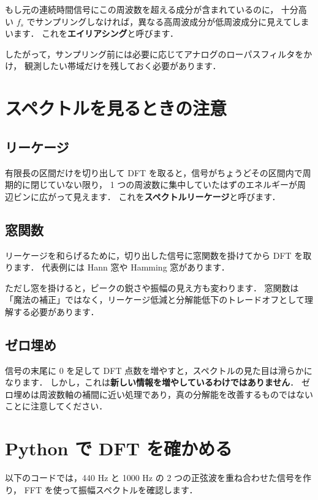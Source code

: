 もし元の連続時間信号にこの周波数を超える成分が含まれているのに，
十分高い $f_s$ でサンプリングしなければ，異なる高周波成分が低周波成分に見えてしまいます．
これを\textbf{エイリアシング}と呼びます．

したがって，サンプリング前には必要に応じてアナログのローパスフィルタをかけ，
観測したい帯域だけを残しておく必要があります．


\section{スペクトルを見るときの注意}

\subsection{リーケージ}

有限長の区間だけを切り出して DFT を取ると，信号がちょうどその区間内で周期的に閉じていない限り，
1 つの周波数に集中していたはずのエネルギーが周辺ビンに広がって見えます．
これを\textbf{スペクトルリーケージ}と呼びます．


\subsection{窓関数}

リーケージを和らげるために，切り出した信号に窓関数を掛けてから DFT を取ります．
代表例には Hann 窓や Hamming 窓があります．

ただし窓を掛けると，ピークの鋭さや振幅の見え方も変わります．
窓関数は「魔法の補正」ではなく，リーケージ低減と分解能低下のトレードオフとして理解する必要があります．


\subsection{ゼロ埋め}

信号の末尾に 0 を足して DFT 点数を増やすと，スペクトルの見た目は滑らかになります．
しかし，これは\textbf{新しい情報を増やしているわけではありません}．
ゼロ埋めは周波数軸の補間に近い処理であり，真の分解能を改善するものではないことに注意してください．


\section{Python で DFT を確かめる}

以下のコードでは，440 Hz と 1000 Hz の 2 つの正弦波を重ね合わせた信号を作り，
FFT を使って振幅スペクトルを確認します．

